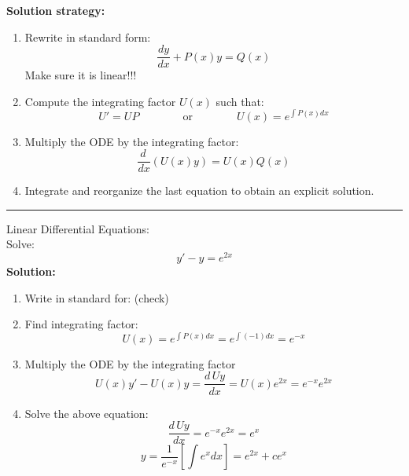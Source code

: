 \textbf{Solution strategy:}
\begin{enumerate}
\item Rewrite in standard form:
\begin{equation*}
\frac{dy}{dx}+P(x) y=Q(x)
\end{equation*}
Make sure it is linear!!! 
\item Compute the integrating factor $U(x)$ such that:
 \begin{equation*}
 U' = UP \qquad \qquad \text{or}\qquad \qquad U(x)=e^{\int P(x) dx}
 \end{equation*}
\item Multiply the ODE by the integrating factor:
 \begin{equation*}
\frac{d\,}{dx} (U(x)y) = U(x)Q(x) 
\end{equation*}

\item Integrate and reorganize the last equation to obtain an explicit solution.
\end{enumerate}

\begin{center}
\noindent\rule{4cm}{0.4pt}
\end{center}


\begin{exmp}{Linear Differential Equations:}\\
Solve:
\begin{equation*}
y'-y=e^{2x}
\end{equation*}
\textbf{Solution:}\\
\begin{enumerate}
\item Write in standard for: (check)
\item Find integrating factor:
 \begin{equation*}
U(x) = e^{\int P(x) dx}= e^{\int(-1) dx}=e^{-x}
 \end{equation*}
 \item Multiply the ODE by the integrating factor
 \begin{equation*}
U(x)y'-U(x)y=\frac{d\, Uy}{dx}=U(x)e^{2x}=e^{-x}e^{2x}
\end{equation*}
\item Solve the above equation:
 \begin{equation*}
\frac{d\, Uy}{dx}=e^{-x}e^{2x}=e^x
\end{equation*}
 \begin{equation*}
y=\frac{1}{e^{-x}}\left[\int{e^x} dx\right]=e^{2x}+ce^x
\end{equation*}
\end{enumerate}

\end{exmp}

